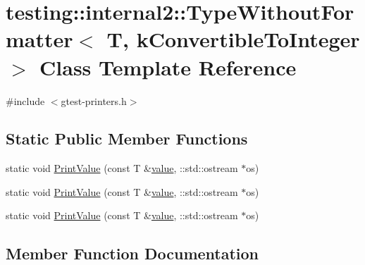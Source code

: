 \hypertarget{classtesting_1_1internal2_1_1_type_without_formatter_3_01_t_00_01k_convertible_to_integer_01_4}{}\section{testing\+::internal2\+::Type\+Without\+Formatter$<$ T, k\+Convertible\+To\+Integer $>$ Class Template Reference}
\label{classtesting_1_1internal2_1_1_type_without_formatter_3_01_t_00_01k_convertible_to_integer_01_4}


{\ttfamily \#include $<$gtest-\/printers.\+h$>$}

\subsection*{Static Public Member Functions}
\begin{DoxyCompactItemize}
\item 
static void \mbox{\hyperlink{classtesting_1_1internal2_1_1_type_without_formatter_3_01_t_00_01k_convertible_to_integer_01_4_ab27a411afb608e730a57d232b3f4f486}{Print\+Value}} (const T \&\mbox{\hyperlink{_obj__test_2lib_2googletest-master_2googlemock_2test_2gmock-matchers__test_8cc_a337b8a670efc0b086ad3af163f3121b6}{value}}, \+::std\+::ostream $\ast$os)
\item 
static void \mbox{\hyperlink{classtesting_1_1internal2_1_1_type_without_formatter_3_01_t_00_01k_convertible_to_integer_01_4_ab27a411afb608e730a57d232b3f4f486}{Print\+Value}} (const T \&\mbox{\hyperlink{_obj__test_2lib_2googletest-master_2googlemock_2test_2gmock-matchers__test_8cc_a337b8a670efc0b086ad3af163f3121b6}{value}}, \+::std\+::ostream $\ast$os)
\item 
static void \mbox{\hyperlink{classtesting_1_1internal2_1_1_type_without_formatter_3_01_t_00_01k_convertible_to_integer_01_4_ab27a411afb608e730a57d232b3f4f486}{Print\+Value}} (const T \&\mbox{\hyperlink{_obj__test_2lib_2googletest-master_2googlemock_2test_2gmock-matchers__test_8cc_a337b8a670efc0b086ad3af163f3121b6}{value}}, \+::std\+::ostream $\ast$os)
\end{DoxyCompactItemize}


\subsection{Member Function Documentation}
\mbox{\label{classtesting_1_1internal2_1_1_type_without_formatter_3_01_t_00_01k_convertible_to_integer_01_4_ab27a411afb608e730a57d232b3f4f486}} 
